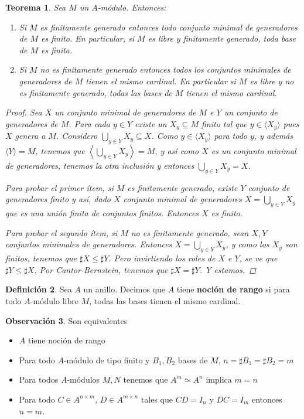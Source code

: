 \documentclass[12pt]{book}
\newtheorem{teo}{Teorema}[section]
\theoremstyle{definition}
\newtheorem{obs}[teo]{Observación}
\newtheorem{defn}[teo]{Definición}
\begin{document}
\begin{teo}
Sea $M$ un $A$-módulo. Entonces:
\begin{enumerate}
\item Si $M$ es finitamente generado entonces todo conjunto minimal de generadores de $M$ es finito. En particular, si $M$ es libre y finitamente generado, toda base de $M$ es finita.
\item Si $M$ no es finitamente generado entonces todos los conjuntos minimales de generadores de $M$ tienen el mismo cardinal. En particular si $M$ es libre y no es finitamente generado, todas las bases de $M$ tienen el mismo cardinal.
\end{enumerate}
\begin{proof}
Sea $X$ un conjunto minimal de generadores de $M$ e $Y$ un conjunto de generadores de $M$. Para cada $y\in Y$ existe un $X_y\subseteq M$ finito tal que $y\in \langle X_y\rangle$ pues $X$ genera a $M$. Considero $\displaystyle\bigcup_{y\in Y}X_y \subseteq X$. Como $y\in\langle X_y\rangle$ para todo $y$, y además $\langle Y\rangle =M$, tenemos que $\left\langle \displaystyle\bigcup_{y\in Y}X_y\right\rangle = M$, y así como $X$ es un conjunto minimal de generadores, tenemos la otra inclusión y entonces $\displaystyle\bigcup_{y\in Y}X_y = X$.

Para probar el primer ítem, si $M$ es finitamente generado, existe $Y$ conjunto de generadores finito y así, dado $X$ conjunto minimal de generadores $X = \displaystyle\bigcup_{y\in Y} X_y$ que es una unión finita de conjuntos finitos. Entonces $X$ es finito.

Para probar el segundo ítem, si $M$ no es finitamente generado, sean $X,Y$ conjuntos minimales de generadores. Entonces $X=\displaystyle\bigcup_{y\in Y} X_y$, y como los $X_y$ son finitos, tenemos que $\sharp X \leq \sharp Y$. Pero invirtiendo los roles de $X$ e $Y$, se ve que $\sharp Y\leq \sharp X$. Por Cantor-Bernstein, tenemos que $\sharp X=\sharp Y$. Y estamos.
\end{proof}
\end{teo}

\begin{defn}
Sea $A$ un anillo. Decimos que $A$ tiene \textbf{noción de rango} si para todo $A$-módulo libre $M$, todas las bases tienen el mismo cardinal.
\end{defn}

\begin{obs}
Son equivalentes \begin{itemize}\item $A$ tiene noción de rango \item Para todo $A$-módulo de tipo finito y $B_1,B_2$ bases de $M$, $n = \sharp B_1 = \sharp B_2 = m$ \item Para todos $A$-módulos $M,N$ tenemos que $A^m\simeq A^n$ implica $m=n$ \item Para todo $C\in A^{n\times m}$, $D\in A^{m\times n}$ tales que $CD=I_n$ y $DC=I_m$ entonces $n=m$. \end{itemize}
\end{obs}
\end{document}
